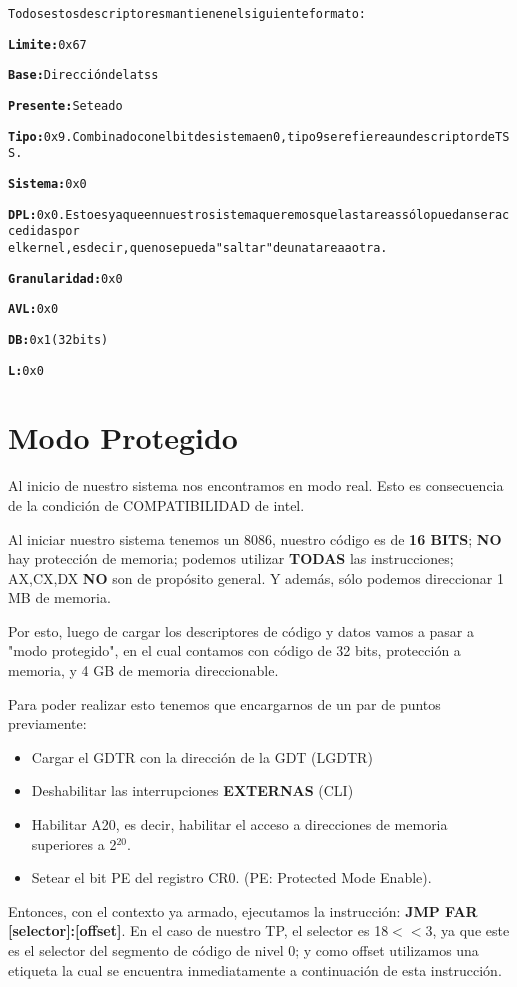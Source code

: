 {\begin{alltt}
\normalfont
		       Todos estos descriptores mantienen el siguiente formato:
		       
         \textbf{Limite:} 0x67
			   
         \textbf{Base:} Dirección de la tss
                     
         \textbf{Presente:} Seteado
                     
         \textbf{Tipo:} 0x9. Combinado con el bit de sistema en 0, tipo 9 se refiere a un descriptor de TSS.
                
         \textbf{Sistema:} 0x0
                     
         \textbf{DPL:} 0x0. Esto es ya que en nuestro sistema queremos que las tareas sólo puedan ser accedidas por
         el kernel, es decir, que no se pueda "saltar" de una tarea a otra.
			 	
         \textbf{Granularidad:} 0x0
                     
         \textbf{AVL:} 0x0
                     
         \textbf{DB:} 0x1 (32 bits)
                     
         \textbf{L:} 0x0
\end{alltt}
}

\section{Modo Protegido}
\par{Al inicio de nuestro sistema nos encontramos en modo real. Esto es consecuencia de la condición de COMPATIBILIDAD de intel. }\par{Al iniciar nuestro sistema tenemos un 8086, nuestro código es de \textbf{16 BITS}; \textbf{NO} hay protección de memoria; podemos utilizar \textbf{TODAS} las instrucciones; AX,CX,DX \textbf{NO} son de propósito general. Y además, sólo podemos direccionar 1 MB de memoria.}\par{ Por esto, luego de cargar los descriptores de código y datos vamos a pasar a "modo protegido", en el cual contamos con código de 32 bits, protección a memoria, y 4 GB de memoria direccionable.
}
\par{
Para poder realizar esto tenemos que encargarnos de un par de puntos previamente:
\begin{itemize}
\item Cargar el GDTR con la dirección de la GDT (LGDTR)
\item Deshabilitar las interrupciones \textbf{EXTERNAS} (CLI)
\item Habilitar A20, es decir, habilitar el acceso a direcciones de memoria superiores a 2$^{20}$.
\item Setear el bit PE del registro CR0. (PE: Protected Mode Enable).
\end{itemize}
Entonces, con el contexto ya armado, ejecutamos la instrucción: \textbf{JMP FAR [selector]:[offset]}. En el caso de nuestro TP, el selector es 18$<<$3, ya que este es el selector del segmento de código de nivel 0; y como offset utilizamos una etiqueta la cual se encuentra inmediatamente a continuación de esta instrucción.
}

\clearpage
